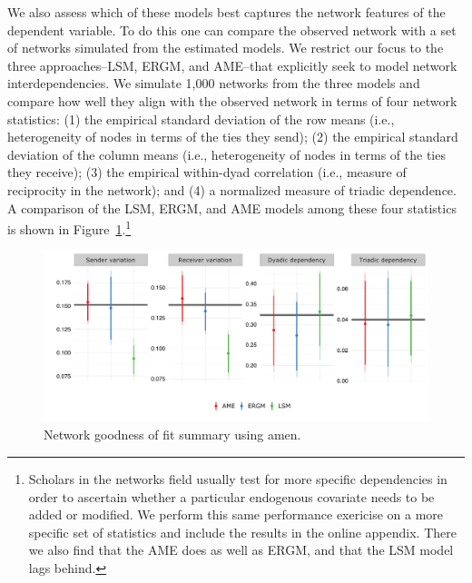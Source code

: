 \documentclass[9pt,twocolumn,twoside,lineno]{pnas-new}
\newcommand{\pkg}[1]{{\fontseries{b}\selectfont #1}}
\begin{document}
We also assess which of these models best captures the network features of the dependent variable. To do this one can compare the observed network with a set of networks simulated from the estimated models. We restrict our focus to the three approaches--LSM, ERGM, and AME--that explicitly seek to model network interdependencies. We simulate 1,000 networks from the three models and compare how well they align with the observed network in terms of four network statistics: (1) the empirical standard deviation of the row means (i.e., heterogeneity of nodes in terms of the ties they send); (2) the empirical standard deviation of the column means (i.e., heterogeneity of nodes in terms of the ties they receive); (3) the empirical within-dyad correlation (i.e., measure of reciprocity in the network); and (4) a normalized measure of triadic dependence. A comparison of the LSM, ERGM, and AME models among these four statistics is shown in Figure~\ref{fig:ergmAmePerf}.\footnote{Scholars in the networks field usually test for more specific dependencies in order to ascertain whether a particular endogenous covariate needs to be added or modified. We perform this same performance exericise on a more specific set of statistics and include the results in the online appendix. There we also find that the AME does as well as ERGM, and that the LSM model lags behind.}

\begin{figure}[ht]
	\centering
	\includegraphics[width=1\textwidth]{netPerfCoef}
	\caption{Network goodness of fit summary using \pkg{amen}.}
	\label{fig:ergmAmePerf}
\end{figure}
\FloatBarrier
\end{document}

